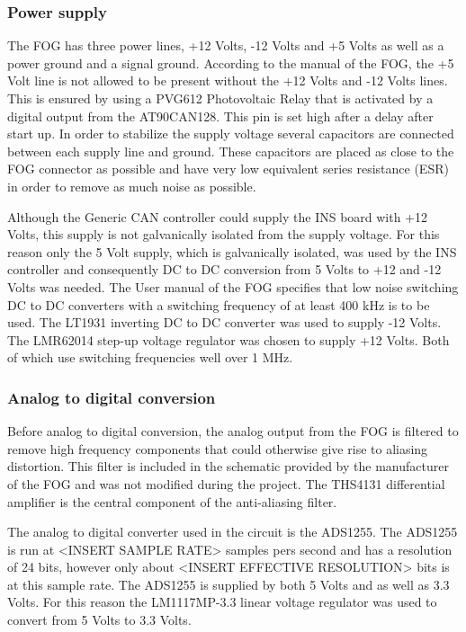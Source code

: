 \subsubsection{Power supply}
The FOG has three power lines, +12 Volts, -12 Volts and +5 Volts as well as a power ground and a signal ground. \newline
According to the manual of the FOG, the +5 Volt line is not allowed to be present without the +12 Volts and -12 Volts lines. This is ensured by using a PVG612 Photovoltaic Relay that is activated by a digital output from the AT90CAN128. This pin is set high after a delay after start up. \newline
In order to stabilize the supply voltage several capacitors are connected between each supply line and ground. These capacitors are placed as close to the FOG connector as possible and have very low equivalent series resistance (ESR) in order to remove as much noise as possible. 

Although the Generic CAN controller could supply the INS board with +12 Volts, this supply is not galvanically isolated from the supply voltage. For this reason only the 5 Volt supply, which is galvanically isolated, was used by the INS controller and consequently DC to DC conversion from 5 Volts to +12 and -12 Volts was needed. \newline
The User manual of the FOG specifies that low noise switching DC to DC converters with a switching frequency of at least 400 kHz is to be used. The LT1931 inverting DC to DC converter was used to supply -12 Volts. The LMR62014 step-up voltage regulator was chosen to supply +12 Volts. Both of which use switching frequencies well over 1 MHz.


\subsubsection{Analog to digital conversion}
Before analog to digital conversion, the analog output from the FOG is filtered to remove high frequency components that could otherwise give rise to aliasing distortion. This filter is included in the schematic provided by the manufacturer of the FOG and was not modified during the project. \newline
The THS4131 differential amplifier is the central component of the anti-aliasing filter. 

The analog to digital converter used in the circuit is the ADS1255. The ADS1255 is run at <INSERT SAMPLE RATE> samples pers second and has a resolution of 24 bits, however only about <INSERT EFFECTIVE RESOLUTION> bits is at this sample rate. \newline
The ADS1255 is supplied by both 5 Volts and as well as 3.3 Volts. For this reason the LM1117MP-3.3 linear voltage regulator was used to convert from 5 Volts to 3.3 Volts. 

